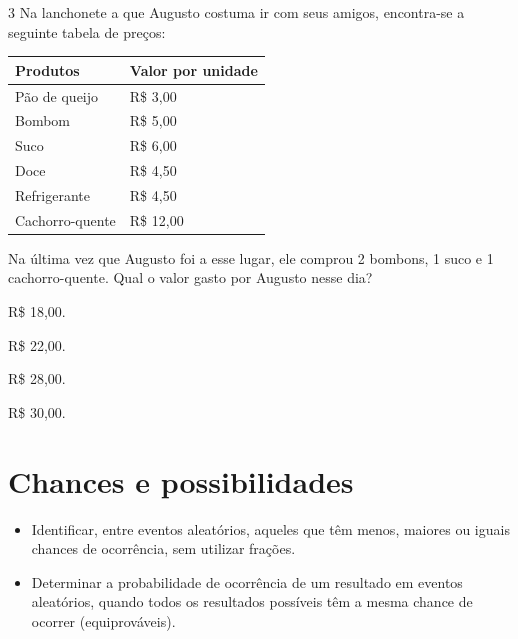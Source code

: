 \pagebreak

\num{3} Na lanchonete a que Augusto costuma ir com seus amigos, encontra-se a
seguinte tabela de preços:

\begin{longtable}[]{@{}ll@{}}
\toprule
Produtos & Valor por unidade\tabularnewline
\midrule
\endhead
Pão de queijo & R\$ 3,00\tabularnewline
Bombom & R\$ 5,00\tabularnewline
Suco & R\$ 6,00\tabularnewline
Doce & R\$ 4,50\tabularnewline
Refrigerante & R\$ 4,50\tabularnewline
Cachorro-quente & R\$ 12,00\tabularnewline
\bottomrule
\end{longtable}

Na última vez que Augusto foi a esse lugar, ele comprou 2 bombons, 1
suco e 1 cachorro-quente. Qual o valor gasto por Augusto nesse dia?

\begin{minipage}{.5\textwidth}
\begin{escolha}
\item
  R\$ 18,00.
\item
  R\$ 22,00.
\item
  R\$ 28,00.
\item
  R\$ 30,00.
\end{escolha}
\end{minipage}

\chapter{Chances e possibilidades}



\begin{itemize}
\item Identificar, entre eventos aleatórios, aqueles que têm menos, maiores ou
iguais chances de ocorrência, sem utilizar frações.

\item Determinar a probabilidade de ocorrência de um resultado em eventos
aleatórios, quando todos os resultados possíveis têm a mesma chance de
ocorrer (equiprováveis).
\end{itemize}

